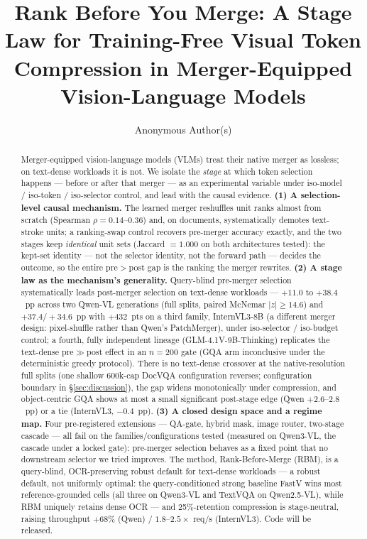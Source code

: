 \documentclass[sigconf,review,anonymous]{acmart}
\begin{document}
\title[Rank Before You Merge]{Rank Before You Merge: A Stage Law for Training-Free Visual Token
  Compression in Merger-Equipped Vision-Language Models}

\author{Anonymous Author(s)}
\renewcommand{\shortauthors}{Anonymous}

\begin{abstract}
Merger-equipped vision-language models (VLMs) treat their native merger as
lossless; on text-dense workloads it is not. We isolate the \emph{stage} at
which token selection happens --- before or after that merger --- as an
experimental variable under iso-model / iso-token / iso-selector control, and
lead with the causal evidence. \textbf{(1) A selection-level causal
mechanism.} The learned merger reshuffles unit ranks almost from scratch
(Spearman $\rho = 0.14$--$0.36$) and, on documents, systematically demotes
text-stroke units; a ranking-swap control recovers pre-merger accuracy exactly,
and the two stages keep \emph{identical} unit sets (Jaccard $= 1.000$ on both
architectures tested): the kept-set identity --- not the selector identity,
not the forward path --- decides the outcome, so the entire pre$>$post gap is
the ranking the merger rewrites. \textbf{(2) A stage law as the mechanism's
generality.} Query-blind pre-merger selection systematically leads post-merger
selection on text-dense workloads --- $+11.0$ to $+38.4$~pp across two Qwen-VL
generations (full splits, paired McNemar $|z| \geq 14.6$) and $+37.4 /
+34.6$~pp with $+432$~pts on a third family, InternVL3-8B (a different merger
design: pixel-shuffle rather than Qwen's PatchMerger), under iso-selector /
iso-budget control; a fourth, fully independent lineage
(GLM-4.1V-9B-Thinking) replicates the text-dense pre$\gg$post effect in an
$n = 200$ gate (GQA arm inconclusive under the deterministic greedy
protocol). There is no text-dense crossover at the native-resolution
full splits (one shallow 600k-cap DocVQA configuration reverses; configuration
boundary in \S\ref{sec:discussion}), the gap widens monotonically under
compression, and object-centric GQA shows at most a small significant
post-stage edge (Qwen $+2.6$--$2.8$~pp) or a tie (InternVL3, $-0.4$~pp).
\textbf{(3) A closed design space and a regime map.} Four pre-registered
extensions --- QA-gate, hybrid mask, image router, two-stage cascade --- all
fail on the families/configurations tested (measured on Qwen3-VL, the cascade
under a locked gate): pre-merger selection behaves as a fixed point that no
downstream selector we tried improves. The method, Rank-Before-Merge (RBM), is
a query-blind, OCR-preserving robust default for text-dense workloads --- a
robust default, not uniformly optimal: the query-conditioned strong baseline
  FastV wins most reference-grounded cells (all three on Qwen3-VL and TextVQA
  on Qwen2.5-VL), while RBM uniquely retains dense OCR --- and 25\%-retention compression is
stage-neutral, raising throughput $+68\%$ (Qwen) / $1.8$--$2.5\times$ req/s
(InternVL3). Code will be released.
\end{abstract}
\end{document}
